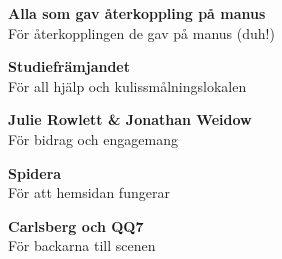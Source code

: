 \begin{paracol}{2}
    \noindent\textbf{Alla som gav återkoppling på manus}\\
    För återkopplingen de gav på manus (duh!)\leavevmode\\    \vspace*{-0.3\baselineskip}

    \noindent\textbf{Studiefrämjandet}\\
    För all hjälp och kulissmålningslokalen\leavevmode\\    \vspace*{-0.3\baselineskip}

    \noindent\textbf{Julie Rowlett \& Jonathan Weidow}\\
    För bidrag och engagemang\leavevmode\\    \vspace*{-0.3\baselineskip}

    \noindent\textbf{Spidera}\\
    För att hemsidan fungerar\leavevmode\\    \vspace*{-0.3\baselineskip}

    \noindent\textbf{Carlsberg och QQ7}\\
    För backarna till scenen\leavevmode

\end{paracol}
